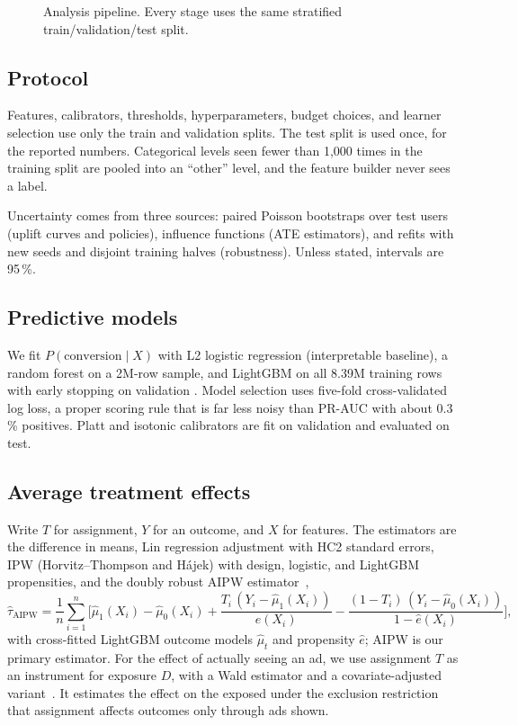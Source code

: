 \begin{figure}[H]
\centering
\resizebox{\linewidth}{!}{}
\caption{Analysis pipeline. Every stage uses the same stratified
train/validation/test split.}
\label{fig:pipeline}
\end{figure}

\subsection{Protocol}
\label{sec:protocol}

Features, calibrators, thresholds, hyperparameters, budget choices, and
learner selection use only the train and validation splits. The test split
is used once, for the reported numbers. Categorical levels seen fewer than
1,000 times in the training split are pooled into an ``other'' level, and
the feature builder never sees a label.

Uncertainty comes from three sources: paired Poisson bootstraps over test
users (uplift curves and policies), influence functions (ATE estimators),
and refits with new seeds and disjoint training halves (robustness). Unless
stated, intervals are 95\,\%.

\subsection{Predictive models}
\label{sec:predictive}

We fit $P(\text{conversion}\mid X)$ with L2 logistic regression
(interpretable baseline), a random forest on a 2M-row sample, and LightGBM
on all 8.39M training rows with early stopping on validation
\cite{ke2017}. Model selection uses five-fold cross-validated log loss, a
proper scoring rule that is far less noisy than PR-AUC with about 0.3\,\%
positives. Platt and isotonic calibrators are fit on validation and
evaluated on test.

\subsection{Average treatment effects}
\label{sec:ate-method}

Write $T$ for assignment, $Y$ for an outcome, and $X$ for features. The
estimators are the difference in means, Lin regression adjustment
\cite{lin2013} with HC2 standard errors, IPW (Horvitz--Thompson and
H{\'a}jek) with design, logistic, and LightGBM propensities, and the doubly
robust AIPW estimator~\cite{robins1994},
\begin{equation}
  \hat\tau_{\mathrm{AIPW}} = \frac{1}{n}\sum_{i=1}^{n}
  \Big[\hat\mu_1(X_i)-\hat\mu_0(X_i)
  + \frac{T_i\,(Y_i-\hat\mu_1(X_i))}{\hat e(X_i)}
  - \frac{(1-T_i)\,(Y_i-\hat\mu_0(X_i))}{1-\hat e(X_i)}\Big],
\end{equation}
with cross-fitted LightGBM outcome models $\hat\mu_t$ and propensity
$\hat e$; AIPW is our primary estimator. For the effect of actually seeing
an ad, we use assignment $T$ as an instrument for exposure $D$, with a Wald
estimator and a covariate-adjusted variant~\cite{imbens1994}. It estimates
the effect on the exposed under the exclusion restriction that assignment
affects outcomes only through ads shown.

